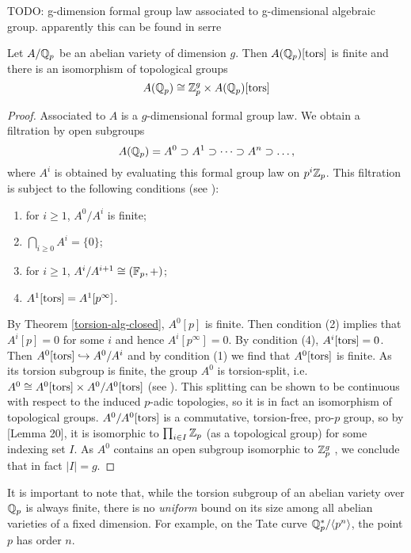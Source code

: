 TODO: g-dimension formal group law associated to g-dimensional algebraic group. apparently this can be found in serre

\begin{theorem}
\label{structure-of-padic-AVs}
Let $A/\mathbb{Q}_p$ be an abelian variety of dimension $g$. Then $A(\mathbb{Q}_p)[\operatorname{tors}]$ is finite and there is an isomorphism of topological groups $$A(\mathbb{Q}_p)\cong \mathbb{Z}_p^g\times A(\mathbb{Q}_p)[\operatorname{tors}]$$
\end{theorem}
\begin{proof}
Associated to $A$ is a $g$-dimensional formal group law. We obtain a filtration by open subgroups $$A(\mathbb{Q}_p)=A^0\supset A^1\supset \dots\supset A^n\supset \dots, $$ where $A^i$ is obtained by evaluating this formal group law on $p^i\mathbb{Z}_p$. This filtration is subject to the following conditions (see \cite{serre2009lie}):
\begin{enumerate}
	\item for $i\geq 1$, $A^0/A^i$ is finite;
	\item $\bigcap_{i\geq 0} A^i = \{0\}$;
	\item for $i\geq 1$, $A^i/A^{i+1}\cong (\mathbb{F}_p, +)$;
	\item $A^1[\operatorname{tors}]=A^1[p^{\infty}]$.
\end{enumerate}
By Theorem \ref{torsion-alg-closed}, $A^0[p]$ is finite. Then condition (2) implies that $A^i[p]=0$ for some $i$ and hence $A^i[p^{\infty}]=0$. By condition (4), $A^i[\operatorname{tors}]=0$. Then $A^0[\operatorname{tors}]\hookrightarrow A^0/A^i$ and by condition (1) we find that $A^0[\operatorname{tors}]$ is finite. As its torsion subgroup is finite, the group $A^0$ is torsion-split, i.e. $A^0\cong A^0[\operatorname{tors}]\times A^0/A^0[\operatorname{tors}]$ (see \cite{baer}). This splitting can be shown to be continuous with respect to the induced $p$-adic topologies, so it is in fact an isomorphism of topological groups. $A^0/A^0[\operatorname{tors}]$ is a commutative, torsion-free, pro-$p$ group, so by \cite{clark2019there}[Lemma 20], it is isomorphic to $\prod_{i\in I} \mathbb{Z}_p$ (as a topological group) for some indexing set $I$. As $A^0$ contains an open subgroup isomorphic to $\mathbb{Z}_p^g$ \cite{serre2009lie}, we conclude that in fact $|I|=g$.
\end{proof}

It is important to note that, while the torsion subgroup of an abelian variety over $\mathbb{Q}_p$ is always finite, there is no \emph{uniform} bound on its size among all abelian varieties of a fixed dimension. For example, on the Tate curve $\mathbb{Q}_p^*/\langle p^n\rangle$, the point $p$ has order $n$.

